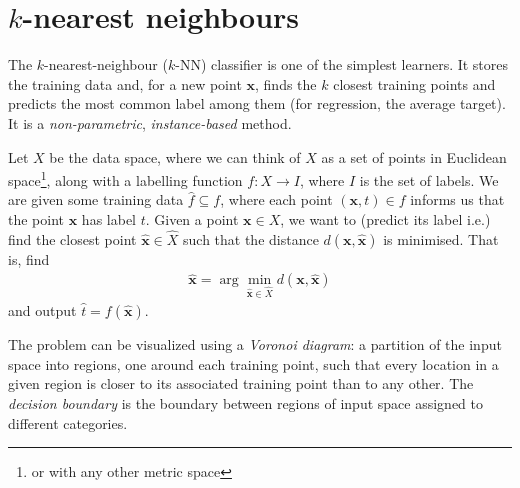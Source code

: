 \documentclass[a4paper, 12pt]{book}
\begin{document}
\section{\texorpdfstring{$k$}{k}-nearest neighbours}

The $k$-nearest-neighbour ($k$-NN) classifier is one of the simplest learners. It stores the training data and, for a new point $\mathbf{x}$, finds the $k$ closest training points and predicts the most common label among them (for regression, the average target). It is a \emph{non-parametric}, \emph{instance-based} method. 



\begin{problem}
   Let $X$ be the data space, where we can think of $X$ as a set of points in Euclidean space\footnote{or with any other metric space}, along with a labelling function $f: X \longrightarrow I$, where $I$ is the set of labels. We are given some training data $\hat{f} \subseteq f$, where each point $(\mathbf{x}, t) \in f$ informs us that the point $\mathbf{x}$ has label $t$. Given a point $\mathbf{x} \in X$, we want to (predict its label i.e.) find the closest point $\hat{\mathbf{x}} \in \hat{X}$ such that the distance $d(\mathbf{x}, \hat{\mathbf{x}})$ is minimised. That is, find 
   \begin{align}
        \hat{\mathbf{x}} = \arg\min_{\hat{\mathbf{x}} \in \hat{X}} d(\mathbf{x}, \hat{\mathbf{x}})
   \end{align}
   and output $\hat{t} = f(\hat{\mathbf{x}})$.
\end{problem}

The problem can be visualized using a \emph{Voronoi diagram}: a partition of the input space into regions, one around each training point, such that every location in a given region is closer to its associated training point than to any other. The \emph{decision boundary} is the boundary between regions of input space assigned to different categories. 
\end{document}
